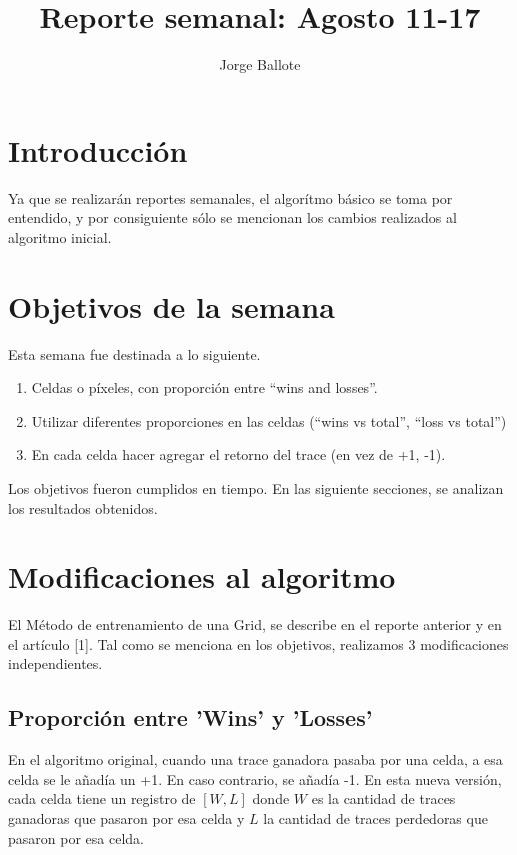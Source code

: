 \documentclass[11pt]{article}
\title{Reporte semanal: Agosto 11-17}
\author{Jorge Ballote}
\begin{document}
% 
\maketitle
\section{Introducción} Ya que se realizarán reportes semanales, el algorítmo básico se toma por entendido, y por consiguiente sólo se mencionan los cambios realizados al algoritmo inicial.

\section{Objetivos de la semana}
Esta semana fue destinada a lo siguiente.
\begin{enumerate}
    \item Celdas o píxeles, con proporción  entre “wins and losses”.
    \item Utilizar diferentes proporciones en las celdas (“wins vs total”, “loss vs total”)
    \item En cada celda hacer agregar el retorno del trace (en vez de +1, -1).
\end{enumerate}
Los objetivos fueron cumplidos en tiempo. En las siguiente secciones, se analizan los resultados obtenidos.

\section{Modificaciones al algoritmo}
El Método de entrenamiento de una Grid, se describe en el reporte anterior y en el artículo [1]. Tal como se menciona en los objetivos, realizamos 3 modificaciones independientes.

\subsection{Proporción entre 'Wins' y 'Losses'}
En el algoritmo original, cuando una trace ganadora pasaba por una celda, a esa celda se le añadía un +1. En caso contrario, se añadía -1. En esta nueva versión, cada celda tiene un registro de $[W,L]$ donde $W$ es la cantidad de traces ganadoras que pasaron por esa celda y $L$ la cantidad de traces perdedoras que pasaron por esa celda.
\end{document}
